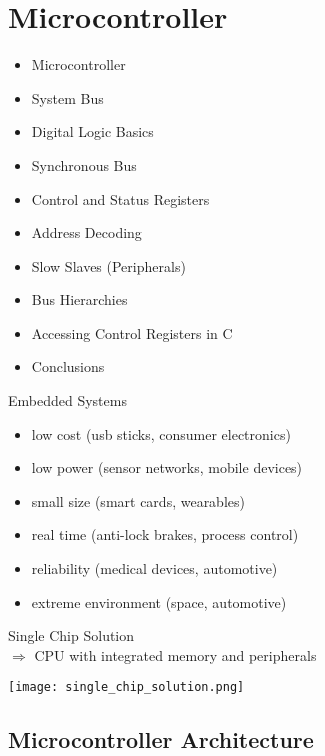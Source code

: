 \section{Microcontroller}

\begin{remark}
    \begin{itemize}
        \item Microcontroller
        \item System Bus
        \item Digital Logic Basics
        \item Synchronous Bus
        \item Control and Status Registers
        \item Address Decoding
        \item Slow Slaves (Peripherals)
        \item Bus Hierarchies
        \item Accessing Control Registers in C
        \item Conclusions
    \end{itemize}
\end{remark}

\begin{theorem}{Embedded Systems}
    \begin{itemize}
        \item low cost (usb sticks, consumer electronics)
        \item low power (sensor networks, mobile devices)
        \item small size (smart cards, wearables)
        \item real time (anti-lock brakes, process control)
        \item reliability (medical devices, automotive)
        \item extreme environment (space, automotive)
    \end{itemize}
\end{theorem}

\begin{concept}{Single Chip Solution} \\
    $\Rightarrow$ CPU with integrated memory and peripherals
\end{concept}

\texttt{[image: single\_chip\_solution.png]}

\multend

\subsection{Microcontroller Architecture}

